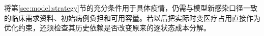 将第\ref{sec:model:strategy}节的充分条件用于具体疫情，仍需与模型新感染口径一致的临床需求资料、初始病例负担和可用容量。若以后把实际时变医疗占用直接作为优化约束，还须检查其历史依赖是否改变原来的逐状态成本分解。
